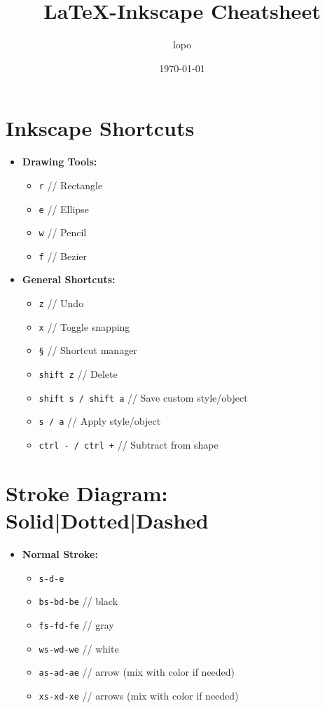 \documentclass{article}
\title{\LaTeX-Inkscape Cheatsheet}
\author{lopo}
\date{\today}
\begin{document}
\maketitle

\begin{multicols}{2} %
\section*{Inkscape Shortcuts}
\begin{itemize}[leftmargin=*]
    \item \textbf{Drawing Tools:}
    \begin{itemize}[label={}]
        \item \texttt{r} // Rectangle
        \item \texttt{e} // Ellipse
        \item \texttt{w} // Pencil
        \item \texttt{f} // Bezier
    \end{itemize}

    \item \textbf{General Shortcuts:}
    \begin{itemize}[label={}]
        \item \texttt{z} // Undo
        \item \texttt{x} // Toggle snapping
        \item \texttt{§} // Shortcut manager
        \item \texttt{shift z} // Delete
        \item \texttt{shift s / shift a} // Save custom style/object
        \item \texttt{s / a} // Apply style/object
        \item \texttt{ctrl - / ctrl +} // Subtract from shape
    \end{itemize}
\end{itemize}

\columnbreak

\section*{Stroke Diagram: Solid|Dotted|Dashed}
\begin{itemize}[leftmargin=*]
    \item \textbf{Normal Stroke:}
    \begin{itemize}[label={}]
        \item \texttt{s-d-e}
        \item \texttt{bs-bd-be} // black
        \item \texttt{fs-fd-fe} // gray
        \item \texttt{ws-wd-we} // white
        \item \texttt{as-ad-ae} // arrow (mix with color if needed)
        \item \texttt{xs-xd-xe} // arrows (mix with color if needed)
    \end{itemize}


\end{itemize}
\end{multicols}
\end{document}
